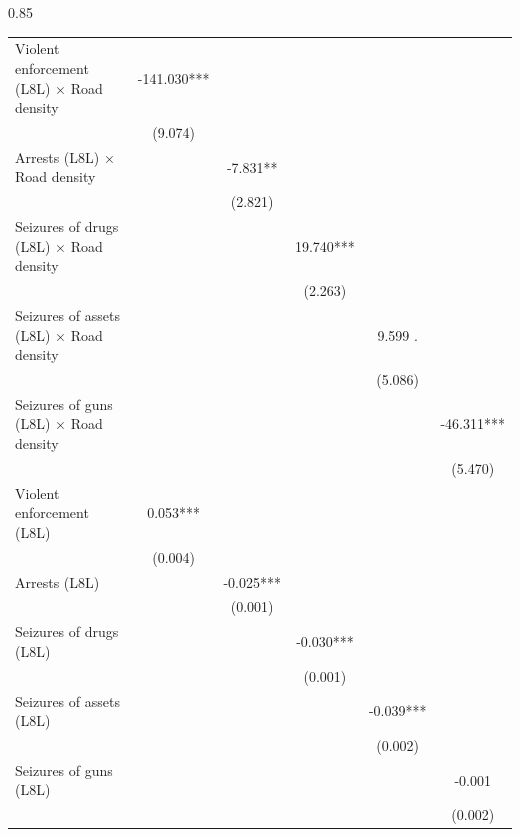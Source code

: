 \documentclass[12pt,letterpaper]{article}
\begin{document}
\begin{landscape}
\begin{center}
\begin{spacing}{0.85}
\begin{longtable}{lccccc}
Violent enforcement (L8L) $\times$ Road density & -141.030*** &   &   &   &   \\
 & (9.074)  &   &   &   &   \\
Arrests (L8L) $\times$ Road density &   & -7.831** &   &   &   \\
 &   & (2.821)  &   &   &   \\
Seizures of drugs (L8L) $\times$ Road density &   &   & 19.740*** &   &   \\
 &   &   & (2.263)  &   &   \\
Seizures of assets (L8L) $\times$ Road density &   &   &   & 9.599 . &   \\
 &   &   &   & (5.086)  &   \\
Seizures of guns (L8L) $\times$ Road density &   &   &   &   & -46.311*** \\
 &   &   &   &   & (5.470)  \\
                
Violent enforcement (L8L)  & 0.053*** &   &   &   &   \\
 & (0.004)  &   &   &   &   \\
Arrests (L8L)  &   & -0.025*** &   &   &   \\
 &   & (0.001)  &   &   &   \\
Seizures of drugs (L8L)  &   &   & -0.030*** &   &   \\
 &   &   & (0.001)  &   &   \\
Seizures of assets (L8L) &   &   &   & -0.039*** &   \\
 &   &   &   & (0.002)  &   \\
Seizures of guns (L8L)  &   &   &   &   & -0.001  \\
 &   &   &   &   & (0.002)  \\


\end{longtable}
\end{spacing}
\end{center}
\end{landscape}
\end{document}
